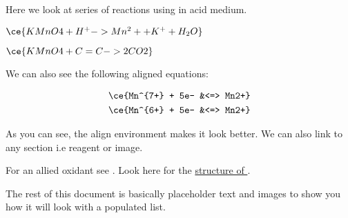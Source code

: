 Here we look at series of reactions using  in acid medium.


$ \ce{KMnO4 + H^+ -> Mn^2+ + K^+ + H_2O} $

$ \ce{KMnO4 + C=C -> 2CO2} $

We can also see the following aligned equations:

\begin{align}
	\ce{Mn^{7+} + 5e- &<=> Mn2+} \\
	\ce{Mn^{6+} + 5e- &<=> Mn2+}
\end{align}

As you can see, the align environment makes it look better.
We can also link to any section i.e reagent or image.

For an allied oxidant see \hyperref[k2cr2o7]{}. 
Look here for the \hyperref[fig:k2cr2o7]{structure of }.

The rest of this document is basically placeholder text and
images to show you how it will look with a populated list.